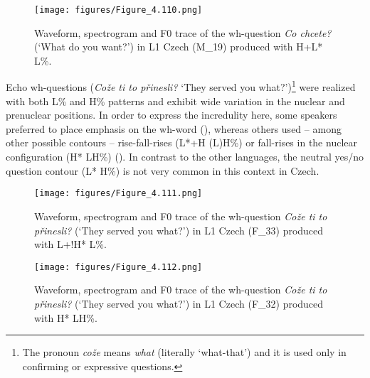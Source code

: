 \begin{figure}
\texttt{[image: figures/Figure\_4.110.png]}



\caption{Waveform, spectrogram and F0 trace of the wh-question \textit{Co chcete?} (‘What do you want?’) in L1 Czech (M\_19) produced with H+L* L\%.}
\label{fig:4.110}
\end{figure}

Echo wh-questions (\textit{Cože ti to přinesli?} ‘They served you what?’)\footnote{The pronoun \textit{cože} means \textit{what} (literally ‘what-that’) and it is used only in confirming or expressive questions.} were realized with both L\% and H\% patterns and exhibit wide variation in the nuclear and prenuclear positions. In order to express the incredulity here, some speakers preferred to place emphasis on the wh-word (), whereas others used -- among other possible contours -- rise-fall-rises (L*+H (L)H\%) or fall-rises in the nuclear configuration (H* LH\%) (). In contrast to the other languages, the neutral yes/no question contour (L* H\%) is not very common in this context in Czech.

\begin{figure}


\texttt{[image: figures/Figure\_4.111.png]}



\caption{Waveform, spectrogram and F0 trace of the wh-question \textit{Cože ti to přinesli?} (‘They served you what?’) in L1 Czech (F\_33) produced with L+!H* L\%.}
\label{fig:4.111}
\end{figure}


\begin{figure}


\texttt{[image: figures/Figure\_4.112.png]}


\caption{Waveform, spectrogram and F0 trace of the wh-question \textit{Cože ti to přinesli?} (‘They served you what?’) in L1 Czech (F\_32) produced with H* LH\%.}
\label{fig:4.112}
\end{figure}


